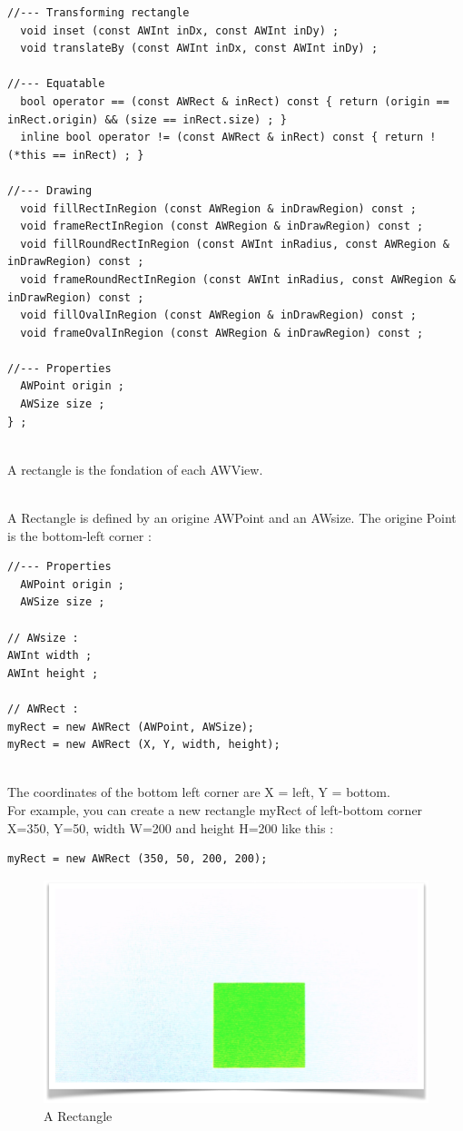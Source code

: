 \documentclass[a4paper,11pt]{extarticle}
\begin{document}
\begin{lstlisting}[language=Arduinonl]
//--- Transforming rectangle
  void inset (const AWInt inDx, const AWInt inDy) ;
  void translateBy (const AWInt inDx, const AWInt inDy) ;

//--- Equatable
  bool operator == (const AWRect & inRect) const { return (origin == inRect.origin) && (size == inRect.size) ; }
  inline bool operator != (const AWRect & inRect) const { return ! (*this == inRect) ; }

//--- Drawing
  void fillRectInRegion (const AWRegion & inDrawRegion) const ;
  void frameRectInRegion (const AWRegion & inDrawRegion) const ;
  void fillRoundRectInRegion (const AWInt inRadius, const AWRegion & inDrawRegion) const ;
  void frameRoundRectInRegion (const AWInt inRadius, const AWRegion & inDrawRegion) const ;
  void fillOvalInRegion (const AWRegion & inDrawRegion) const ;
  void frameOvalInRegion (const AWRegion & inDrawRegion) const ;

//--- Properties
  AWPoint origin ;
  AWSize size ;
} ;
\end{lstlisting}

~\\ A rectangle is the fondation of each AWView.

~\\ A Rectangle is defined by an origine AWPoint and an AWsize. The origine Point is the bottom-left corner :

\begin{lstlisting}[language=Arduinonl]
//--- Properties
  AWPoint origin ;
  AWSize size ;
  
// AWsize :
AWInt width ;
AWInt height ;

// AWRect :
myRect = new AWRect (AWPoint, AWSize);
myRect = new AWRect (X, Y, width, height);
\end{lstlisting}

~\\The coordinates of the bottom left corner are X = left, Y = bottom.
~\\ For example, you can create a new rectangle myRect of left-bottom corner X=350, Y=50, width W=200 and height H=200 like this :
\begin{lstlisting}[language=Arduinonl]
myRect = new AWRect (350, 50, 200, 200);
\end{lstlisting}

\begin{figure}[htbp]
   \centering
   \includegraphics[scale=0.6]{AWFig6.png} 
   \caption{A Rectangle}
   \label{fig:6 }
\end{figure}
\end{document}
